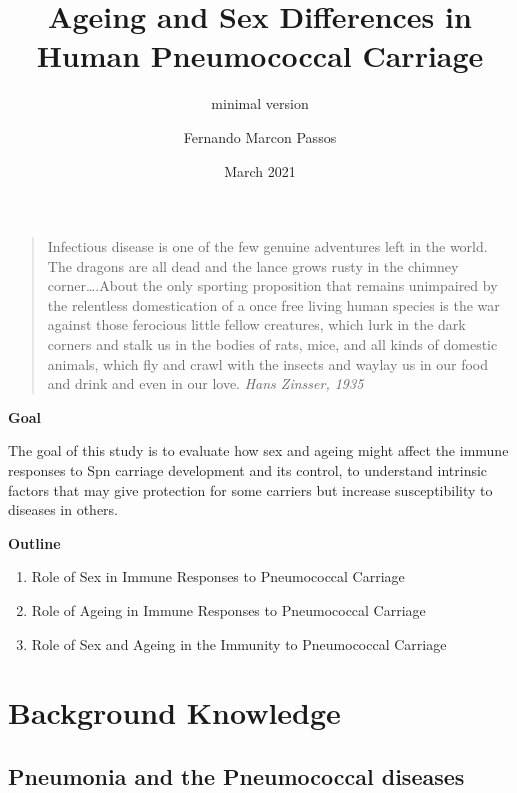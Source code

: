 \documentclass[
]{book}
\title{Ageing and Sex Differences in Human Pneumococcal Carriage}
\subtitle{minimal version}
\author{Fernando Marcon Passos}
\date{March 2021}
\begin{document}
\maketitle

{
\setcounter{tocdepth}{1}
\tableofcontents
}
\hypertarget{section}{%
\chapter*{}\label{section}}

\begin{quote}
Infectious disease is one of the few genuine adventures left in the world. The dragons are all dead and the lance grows rusty in the chimney corner\ldots.About the only sporting proposition that remains unimpaired by the relentless domestication of a once free living human species is the war against those ferocious little fellow creatures, which lurk in the dark corners and stalk us in the bodies of rats, mice, and all kinds of domestic animals, which fly and crawl with the insects and waylay us in our food and drink and even in our love. \emph{Hans Zinsser, 1935}
\end{quote}

\textbf{Goal}

The goal of this study is to evaluate how sex and ageing might affect the immune responses to Spn carriage development and its control, to understand intrinsic factors that may give protection for some carriers but increase susceptibility to diseases in others.

\textbf{Outline}

\begin{enumerate}
\def\labelenumi{\arabic{enumi}.}
\item
  Role of Sex in Immune Responses to Pneumococcal Carriage
\item
  Role of Ageing in Immune Responses to Pneumococcal Carriage
\item
  Role of Sex and Ageing in the Immunity to Pneumococcal Carriage
\end{enumerate}

\hypertarget{intro}{%
\chapter{Background Knowledge}\label{intro}}

\hypertarget{pneumonia-and-the-pneumococcal-diseases}{%
\section{Pneumonia and the Pneumococcal diseases}\label{pneumonia-and-the-pneumococcal-diseases}}
\end{document}
